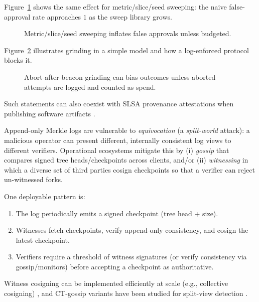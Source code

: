\documentclass[11pt]{article}
\begin{document}
Figure~\ref{fig:sweep_grinding} shows the same effect for metric/slice/seed sweeping: the naive false-approval rate approaches $1$ as the sweep library grows.

\begin{figure}[t]
\centering
{}
\caption{Metric/slice/seed sweeping inflates false approvals unless budgeted.}
\label{fig:sweep_grinding}
\end{figure}

Figure~\ref{fig:abort} illustrates grinding in a simple model and how a log-enforced protocol blocks it.

\begin{figure}[t]
\centering
{}
\caption{Abort-after-beacon grinding can bias outcomes unless aborted attempts are logged and counted as spend.}
\label{fig:abort}
\end{figure}

Such statements can also coexist with SLSA provenance attestations when publishing software artifacts \cite{slsa_provenance_v1}.

Append-only Merkle logs are vulnerable to \emph{equivocation} (a \emph{split-world} attack): a malicious operator can present different, internally consistent log views to different verifiers.
Operational ecosystems mitigate this by (i) \emph{gossip} that compares signed tree heads/checkpoints across clients, and/or
(ii) \emph{witnessing} in which a diverse set of third parties cosign checkpoints so that a verifier can reject un-witnessed forks.

One deployable pattern is:
\begin{enumerate}
\item The log periodically emits a signed checkpoint (tree head + size).
\item Witnesses fetch checkpoints, verify append-only consistency, and cosign the latest checkpoint.
\item Verifiers require a threshold of witness signatures (or verify consistency via gossip/monitors) before accepting a checkpoint as authoritative.
\end{enumerate}
Witness cosigning can be implemented efficiently at scale (e.g., collective cosigning) \cite{syta2016cosi}, and CT-gossip variants have been studied for split-view detection \cite{dahlberg2018ctgossip}.
\end{document}
